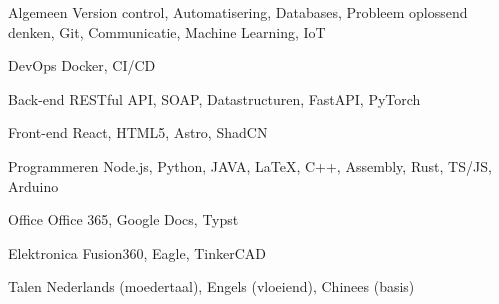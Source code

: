 
\begin{cvskills}

    \cvskill
    {Algemeen} %
    {Version control, Automatisering, Databases, Probleem oplossend denken, Git, Communicatie, Machine Learning, IoT} %

    \cvskill
    {DevOps} %
    {Docker, CI/CD} %

    \cvskill
    {Back-end} %
    {RESTful API, SOAP, Datastructuren, FastAPI, PyTorch} %

    \cvskill
    {Front-end} %
    {React, HTML5, Astro, ShadCN} %

    \cvskill
    {Programmeren} %
    {Node.js, Python, JAVA, LaTeX, C++, Assembly, Rust, TS/JS, Arduino} %

    \cvskill
    {Office} %
    {Office 365, Google Docs, Typst} %

    \cvskill
    {Elektronica} %
    {Fusion360, Eagle, TinkerCAD} %

    \cvskill
    {Talen} %
    {Nederlands (moedertaal), Engels (vloeiend), Chinees (basis)} %
\end{cvskills}
